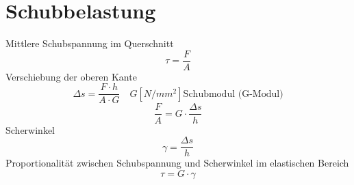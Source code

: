 



\section{Schubbelastung}
Mittlere Schubspannung im Querschnitt
\[ \tau = \frac{F}{A} \]
Verschiebung der oberen Kante
\[ \Delta s = \frac{F \cdot h}{A \cdot G} \quad G [N/mm^2] \text{Schubmodul (G-Modul)} \]
\[ \frac{F}{A} = G \cdot \frac{\Delta s}{h} \]
Scherwinkel
\[ \gamma = \frac{\Delta s}{h} \]
Proportionalität zwischen Schubspannung und Scherwinkel im elastischen Bereich
\[ \tau = G \cdot \gamma \]
